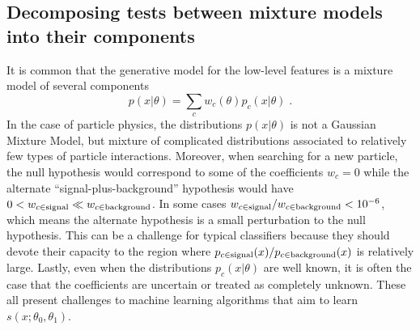\documentclass[11pt, oneside]{article}   	%
\begin{document}
\subsection{Decomposing tests between mixture models into their components}

It is common that the generative model for the low-level features is a mixture model of several components
\begin{equation}
p(x|\theta)=\sum_c w_c(\theta) p_c(x| \theta) \;.
\end{equation}
In the case of particle physics, the distributions $p(x|\theta)$ is not a Gaussian Mixture Model, but mixture of  complicated distributions associated to relatively few types of particle interactions. Moreover, when searching for a new particle, the null hypothesis would correspond to some of the coefficients $w_c=0$ while the alternate ``signal-plus-background'' hypothesis would have $0<w_{c\in \rm signal} \ll w_{c\in \rm background}$. In some cases $w_{c\in \rm signal} / w_{c\in \rm background} <10^{-6}$, which means the alternate hypothesis is a small perturbation to the null hypothesis. This can be a challenge for typical classifiers because they should devote their capacity to the region where $p_{c\in \rm signal}(x) / p_{c\in \rm background}(x)$ is relatively large. Lastly, even when the distributions $p_c(x|\theta)$ are well known, it is often the case that the coefficients are uncertain or treated as completely unknown. These all present challenges to machine learning algorithms that aim to learn $s(x; \theta_0, \theta_1)$.

%
\end{document}
